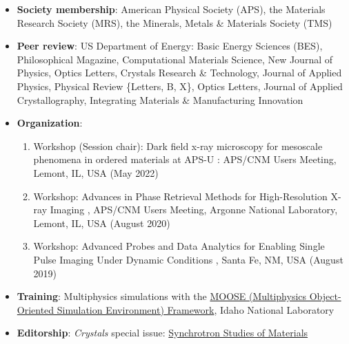 \begin{itemize}
    \item \textbf{Society membership}: American Physical Society (APS), the Materials Research Society (MRS), the Minerals, Metals \& Materials Society (TMS)
    \item \textbf{Peer review}: US Department of Energy: Basic Energy Sciences (BES), Philosophical Magazine, Computational Materials Science, New Journal of Physics, 
        Optics Letters, Crystals Research \& Technology, Journal of Applied Physics, Physical Review \{Letters, B, X\}, Optics Letters, Journal of Applied Crystallography, 
        Integrating Materials \& Manufacturing Innovation
    \item \textbf{Organization}: 
        \begin{enumerate}
            \item Workshop (Session chair): Dark field x-ray microscopy for mesoscale phenomena in ordered materials at APS-U : APS/CNM Users Meeting, Lemont, IL, USA (May 2022)
            \item Workshop: Advances in Phase Retrieval Methods for High-Resolution X-ray Imaging , APS/CNM Users Meeting, Argonne National Laboratory, Lemont, IL, USA (August 2020)
            \item Workshop: Advanced Probes and Data Analytics for Enabling Single Pulse Imaging Under Dynamic Conditions , Santa Fe, NM, USA (August 2019)
        \end{enumerate}
    \item \textbf{Training}: Multiphysics simulations with the \href{https://mooseframework.inl.gov/}{MOOSE (Multiphysics Object-Oriented Simulation Environment) Framework}, Idaho National Laboratory
    \item \textbf{Editorship}: \emph{Crystals} special issue: \href{https://web.archive.org/web/20210930195051/https://www.mdpi.com/journal/crystals/special_issues/Synchrotron_Studies}{Synchrotron Studies of Materials} 
\end{itemize}